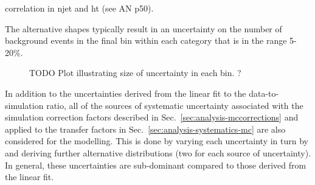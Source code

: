 correlation in njet and ht (see AN p50).

The alternative \mht shapes typically result in an uncertainty on the number of 
background events in the final \mht bin within each \njnbht category that is in 
the range 5-20\%.
\begin{figure}
TODO	Plot illustrating size of uncertainty in each bin. ?
\end{figure}

In addition to the uncertainties derived from the linear fit to the 
data-to-simulation ratio, all of the sources of systematic uncertainty 
associated with the simulation correction factors described in 
Sec.~\ref{sec:analysis-mccorrections} and applied to the transfer factors in 
Sec.~\ref{sec:analysis-systematics-mc} are also considered for the \mht 
modelling. This is done by varying each uncertainty in turn by \pmonesigma 
and deriving further alternative \mht distributions (two for each source of 
uncertainty). In general, these uncertainties are sub-dominant compared to 
those derived from the linear fit.
